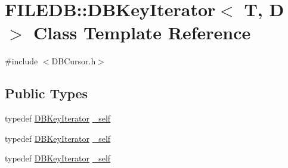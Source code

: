 \hypertarget{classFILEDB_1_1DBKeyIterator}{}\section{F\+I\+L\+E\+DB\+:\+:D\+B\+Key\+Iterator$<$ T, D $>$ Class Template Reference}
\label{classFILEDB_1_1DBKeyIterator}


{\ttfamily \#include $<$D\+B\+Cursor.\+h$>$}

\subsection*{Public Types}
\begin{DoxyCompactItemize}
\item 
typedef \mbox{\hyperlink{classFILEDB_1_1DBKeyIterator}{D\+B\+Key\+Iterator}} \mbox{\hyperlink{classFILEDB_1_1DBKeyIterator_aaf7773c7a848ec6e04bc738dd794ace1}{\+\_\+self}}
\item 
typedef \mbox{\hyperlink{classFILEDB_1_1DBKeyIterator}{D\+B\+Key\+Iterator}} \mbox{\hyperlink{classFILEDB_1_1DBKeyIterator_aaf7773c7a848ec6e04bc738dd794ace1}{\+\_\+self}}
\item 
typedef \mbox{\hyperlink{classFILEDB_1_1DBKeyIterator}{D\+B\+Key\+Iterator}} \mbox{\hyperlink{classFILEDB_1_1DBKeyIterator_aaf7773c7a848ec6e04bc738dd794ace1}{\+\_\+self}}
\end{DoxyCompactItemize}
